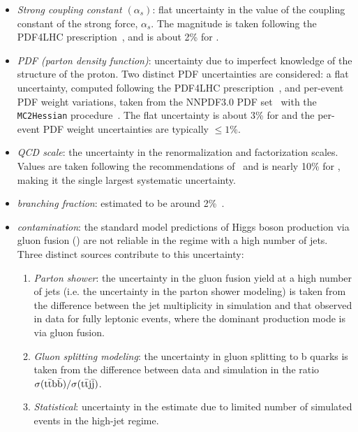 \begin{itemize}
    \item \emph{Strong coupling constant $(\alpha_s)$}: flat uncertainty in the value of the coupling constant of the strong force, $\alpha_s$. The magnitude is taken following the PDF4LHC prescription~\cite{pdf4lhc}, and is about 2\% for \ttH. 
    \item \emph{PDF (parton density function)}: uncertainty due to imperfect knowledge of the structure of the proton. Two distinct PDF uncertainties are considered: a flat uncertainty, computed following the PDF4LHC prescription~\cite{pdf4lhc,higgs_handbook}, and per-event PDF weight variations, taken from the NNPDF3.0 PDF set~\cite{ball_pdf} with the \texttt{MC2Hessian} procedure~\cite{mc2hessian}. The flat uncertainty is about 3\% for \ttH and the per-event PDF weight uncertainties are typically $\leq1\%$.
    \item \emph{QCD scale}: the uncertainty in the renormalization and factorization scales. Values are taken following the recommendations of~\cite{florian2016handbook} and is nearly 10\% for \ttH, making it the single largest systematic uncertainty.
    \item \emph{\Hgg branching fraction}: estimated to be around 2\%~\cite{florian2016handbook}.
    \item \emph{\ggH contamination}: the standard model predictions of Higgs boson production via gluon fusion (\ggH) are not reliable in the \ttH regime with a high number of jets. Three distinct sources contribute to this uncertainty:
    \begin{enumerate}
        \item \emph{Parton shower}: the uncertainty in the gluon fusion yield at a high number of jets (i.e. the uncertainty in the parton shower modeling) is taken from the difference between the jet multiplicity in simulation and that observed in data for fully leptonic \ttbar events, where the dominant production mode is via gluon fusion. 
        \item \emph{Gluon splitting modeling}: the uncertainty in gluon splitting to b quarks is taken from the difference between data and simulation in the ratio $\sigma (\mathrm{t\bar{t}}\mathrm{b\bar{b}}) / \sigma (\mathrm{t\bar{t}}\mathrm{j\bar{j}})$.
        \item \emph{Statistical}: uncertainty in the \ggH estimate due to limited number of simulated events in the high-jet regime.
    \end{enumerate}
\end{itemize}

